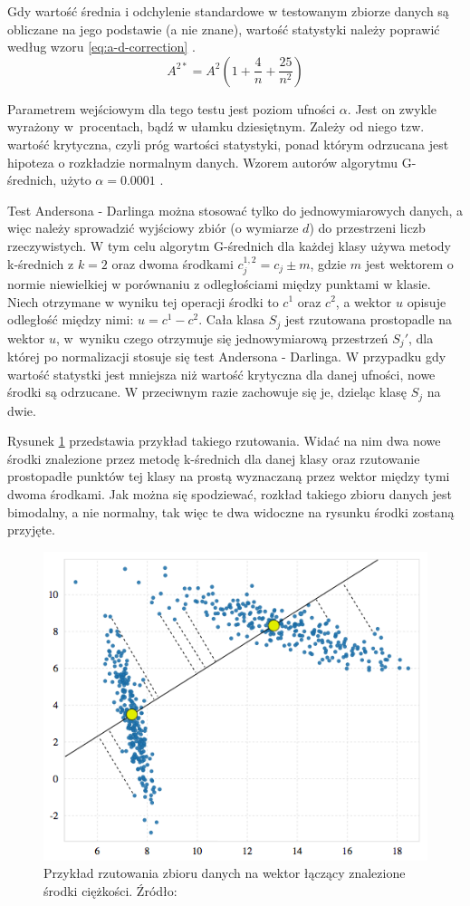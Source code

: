 Gdy wartość średnia i odchylenie standardowe w testowanym zbiorze danych są obliczane na jego podstawie (a nie znane), wartość statystyki należy poprawić według wzoru \ref{eq:a-d-correction} \cite{GMeans}.
\begin{equation}
\label{eq:a-d-correction}
	A^{2*} = A^{2}(1 + \frac{4}{n} + \frac{25}{n^{2}})
\end{equation}

Parametrem wejściowym dla tego testu jest poziom ufności $\alpha$. Jest on zwykle wyrażony w~procentach, bądź w ułamku dziesiętnym. Zależy od niego tzw. wartość krytyczna, czyli próg wartości statystyki, ponad którym odrzucana jest hipoteza o rozkładzie normalnym danych. Wzorem autorów algorytmu G-średnich, użyto $\alpha=0.0001$ \cite{GMeans}.

Test Andersona - Darlinga można stosować tylko do jednowymiarowych danych, a więc należy sprowadzić wyjściowy zbiór (o wymiarze $d$) do przestrzeni liczb rzeczywistych. W tym celu algorytm G-średnich dla każdej klasy używa metody k-średnich z $k=2$ oraz dwoma środkami $c^{1,2}_j = c_j \pm m$, gdzie $m$ jest wektorem o normie niewielkiej w porównaniu z odległościami między punktami w klasie. Niech otrzymane w wyniku tej operacji środki to $c^1$ oraz $c^2$, a wektor $u$ opisuje odległość między nimi: $u = c^1 - c^2$. Cała klasa $S_j$ jest rzutowana prostopadle na wektor $u$, w~wyniku czego otrzymuje się jednowymiarową przestrzeń $S_j '$, dla której po normalizacji stosuje się test Andersona - Darlinga. W przypadku gdy wartość statystki jest mniejsza niż wartość krytyczna dla danej ufności, nowe środki są odrzucane. W przeciwnym razie zachowuje się je, dzieląc klasę $S_j$ na dwie.

Rysunek \ref{fig:g-means-projection} przedstawia przykład takiego rzutowania. Widać na nim dwa nowe środki znalezione przez metodę k-średnich dla danej klasy oraz rzutowanie prostopadłe punktów tej klasy na prostą wyznaczaną przez wektor między tymi dwoma środkami. Jak można się spodziewać, rozkład takiego zbioru danych jest bimodalny, a nie normalny, tak więc te dwa widoczne na rysunku środki zostaną przyjęte.

\begin{figure}
\centering
\includegraphics[width=0.7\linewidth]{Grafika/g-means-projection}
\caption{Przykład rzutowania zbioru danych na wektor łączący znalezione środki ciężkości. Źródło: \cite{GMeansExplanation}}
\label{fig:g-means-projection}
\end{figure}

